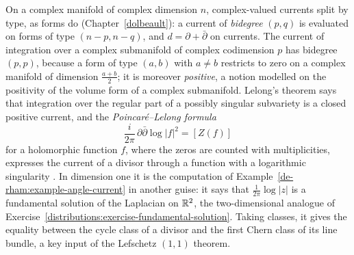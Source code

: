 \begin{remark}\label{de-rham:remark-complex-currents}
On a complex manifold of complex dimension $n$, complex-valued currents split by type, as forms do (Chapter~\ref{dolbeault}): a current of \emph{bidegree} $(p, q)$ is evaluated on forms of type
$(n - p, n - q)$, and $d = \partial + \bar\partial$ on currents. The current of integration over a complex submanifold of complex codimension $p$ has bidegree $(p, p)$, because a form of type
$(a, b)$ with $a \neq b$ restricts to zero on a complex manifold of dimension $\frac{a+b}{2}$; it is moreover \emph{positive}, a notion modelled on the positivity of the volume form of a complex
submanifold. Lelong's theorem says that integration over the regular part of a possibly singular subvariety is a closed positive current, and the \emph{Poincar\'e--Lelong formula}
\[
\frac{i}{2\pi}\,\partial\bar\partial\log|f|^2 = [Z(f)]
\]
for a holomorphic function $f$, where the zeros are counted with multiplicities, expresses the current of a divisor through a function with a logarithmic singularity
\cite[Chapter 3]{griffiths-harris}. In dimension one it is the computation of Example~\ref{de-rham:example-angle-current} in another guise: it says that $\frac{1}{2\pi}\log|z|$ is a fundamental solution of the Laplacian
on $\mathbb{R}^2$, the two-dimensional analogue of Exercise~\ref{distributions:exercise-fundamental-solution}. Taking classes, it gives the equality between the cycle class of a divisor and the first Chern class of its line bundle, a key
input of the Lefschetz $(1,1)$ theorem.
\end{remark}

